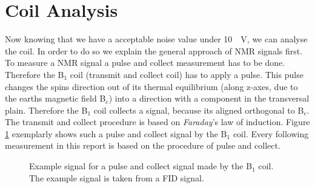 \section{Coil Analysis}
\label{sec:CoilAnalyssis}
Now knowing that we have a acceptable noise value under \SI{10}{\mu \volt}, we can analyse the coil. In order to do so we explain the general approach of NMR signals first. To measure a NMR signal a pulse and collect measurement has to be done. Therefore the B$_1$ coil (transmit and collect coil) has to apply a pulse. This pulse changes the spins direction out of its thermal equilibrium (along z-axes, due to the earths magnetic field B$_e$) into a direction with a component in the transversal plain. Therefore the B$_1$ coil collects a signal, because its aligned orthogonal to B$_e$. The transmit and collect procedure is based on \textit{Faraday}'s law of induction. Figure \ref{fig: PulsandcollectValesignal} exemplarly shows such a pulse and collect signal by the B$_1$ coil. Every following measurement in this report is based on the procedure of pulse and collect.

\begin{figure}[H]
    \centering
    
    \caption[Example signal for a pulse and collect signal made by the B$_1$ coil.]{Example signal for a pulse and collect signal made by the B$_1$ coil. The example signal is taken from a FID signal.}
    \label{fig: PulsandcollectValesignal}
\end{figure}

